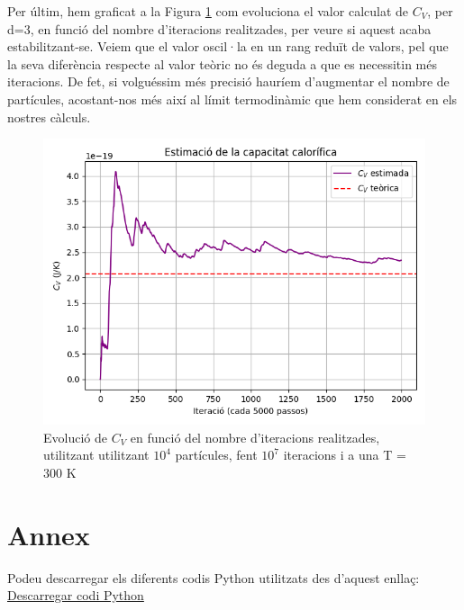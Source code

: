 \documentclass{article}
\begin{document}
	Per últim, hem graficat a la Figura \ref{figura_evolucio_C_V}  com evoluciona el valor calculat de $C_V$, per d=3, en funció del nombre d'iteracions realitzades, per veure si aquest acaba estabilitzant-se. Veiem que el valor oscil·la en un rang reduït de valors, pel que la seva diferència respecte al valor teòric no és deguda a que es necessitin més iteracions. De fet, si volguéssim més precisió hauríem d'augmentar el nombre de partícules, acostant-nos més així al límit termodinàmic que hem considerat en els nostres càlculs. 
	
\begin{figure}[h!]
	\centering
	\includegraphics[width=0.7\linewidth]{MonteCarlo.png}
	\caption{Evolució de $C_V$ en funció del nombre d'iteracions realitzades, utilitzant utilitzant $10^4$ partícules, fent $10^7$ iteracions i a una T = 300 K}
	\label{figura_evolucio_C_V}
\end{figure}

\newpage

\section*{Annex}
Podeu descarregar els diferents codis Python utilitzats des d'aquest enllaç: \\
\href{https://drive.google.com/drive/folders/15ynOzz0lKhWNOVCDJGllM2V2zCnDKDyw}{Descarregar codi Python}
	
	
\end{document}
